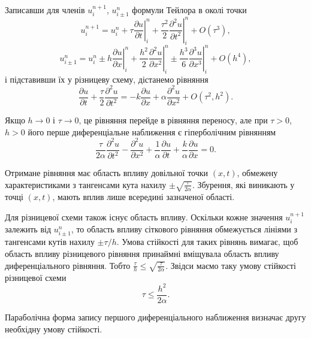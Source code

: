 Записавши для членів $u_i^{n+1}$, $u_{i\pm1}^n$ формули Тейлора в околі точки  
\begin{equation*}
    u_i^{n+1}=u_i^n+\tau\left.\frac{\partial u}{\partial t}\right|_i^n+\frac{\tau^2}{2}\left.\frac{\partial^2 u}{\partial t^2}\right|_i^n+O(\tau^3),
\end{equation*}
\begin{equation*}
    u_{i\pm1}^n=u_i^n\pm h\left.\frac{\partial u}{\partial x}\right|_i^n+\frac{h^2}{2}\left.\frac{\partial^2 u}{\partial x^2}\right|_i^n\pm\frac{h^3}{6}\left.\frac{\partial^3 u}{\partial x^3}\right|_i^n+O(h^4),
\end{equation*}
і підставивши їх у різницеву схему, дістанемо рівняння
\begin{equation*}
    \frac{\partial u}{\partial t} + \frac{\tau}{2} \frac{\partial^2 u}{\partial t^2} = -k \frac{\partial u}{\partial x} + \alpha \frac{\partial^2 u}{\partial x^2} + O(\tau^2, h^2).
\end{equation*}

Якщо $h \to 0$ і $\tau \to 0$, це рівняння перейде в рівняння переносу, але при $\tau > 0$, $h > 0$ його перше диференціальне наближення є гіперболічним рівнянням
\begin{equation}
    \label{eq:l9.6}
    \frac{\tau}{2\alpha} \frac{\partial^2 u}{\partial t^2} - \frac{\partial^2 u}{\partial x^2} + \frac{1}{\alpha} \frac{\partial u}{\partial t} + \frac{k}{\alpha} \frac{\partial u}{\partial x} = 0.
\end{equation}

Отримане рівняння має область впливу довільної точки $(x,t)$, обмежену характеристиками з тангенсами кута нахилу $\pm\sqrt{\frac{\tau}{2\alpha}}$. Збурення, які виникають у точці $(x,t)$, мають вплив лише всередині зазначеної області. \medskip

Для різницевої схеми також існує область впливу. Оскільки кожне значення $u_i^{n+1}$ залежить від $u_{i\pm1}^n$, то область впливу сіткового рівняння обмежується лініями з тангенсами кутів нахилу $\pm\tau/h$. Умова стійкості для таких рівнянь вимагає, щоб область впливу різницевого рівняння принаймні вміщувала область впливу диференціального рівняння. Тобто $\frac{\tau}{h} \le \sqrt{\frac{\tau}{2\alpha}}$. Звідси маємо таку умову стійкості різницевої схеми
\begin{equation}
    \label{eq:l9.7}
    \tau \le \frac{h^2}{2\alpha}.
\end{equation}

Параболічна форма запису першого диференціального наближення визначає другу необхідну умову стійкості. \medskip

